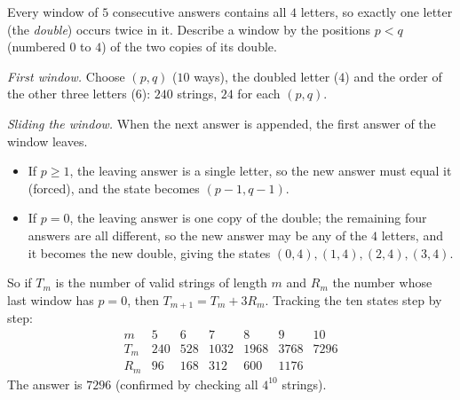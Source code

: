 Every window of $5$ consecutive answers contains all $4$ letters, so exactly one letter (the \emph{double}) occurs twice in it. Describe a window by the positions $p<q$ (numbered $0$ to $4$) of the two copies of its double.

\emph{First window.} Choose $(p,q)$ ($10$ ways), the doubled letter ($4$) and the order of the other three letters ($6$): $240$ strings, $24$ for each $(p,q)$.

\emph{Sliding the window.} When the next answer is appended, the first answer of the window leaves.
\begin{itemize}
\item If $p\ge1$, the leaving answer is a single letter, so the new answer must equal it (forced), and the state becomes $(p-1,q-1)$.
\item If $p=0$, the leaving answer is one copy of the double; the remaining four answers are all different, so the new answer may be any of the $4$ letters, and it becomes the new double, giving the states $(0,4),(1,4),(2,4),(3,4)$.
\end{itemize}
So if $T_m$ is the number of valid strings of length $m$ and $R_m$ the number whose last window has $p=0$, then $T_{m+1}=T_m+3R_m$. Tracking the ten states step by step:
\[\begin{array}{c|cccccc}m&5&6&7&8&9&10\\\hline T_m&240&528&1032&1968&3768&7296\\R_m&96&168&312&600&1176&\end{array}\]
The answer is $\boxed{7296}$ (confirmed by checking all $4^{10}$ strings).
